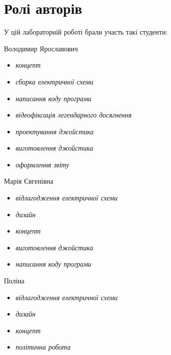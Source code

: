 \chapter*{Ролі авторів} 

У цій лабораторній роботі брали участь такі студенти:
\begin{itemize}
 Володимир Ярославович
\begin{itemize}
    \item\textit{концепт}
    \item\textit{сборка електричної схеми}
    \item\textit{написання коду програми}
    \item\textit{відеофіксація легендарного досягнення}
    \item\textit{проектування джойстика}
    \item\textit{виготовлення джойстика}
    \item\textit{оформлення звіту}
\end{itemize}
 Марія Євгенівна
\begin{itemize}
    \item\textit{відлагодження електричної схеми}
    \item\textit{дизайн}
    \item\textit{концепт}
    \item\textit{виготовлення джойстика}
    \item\textit{написання коду програми}
\end{itemize}
 Поліна
\begin{itemize}
    \item\textit{відлагодження електричної схеми}
    \item\textit{дизайн}
    \item\textit{концепт}
    \item\textit{політична робота}
\end{itemize}
\end{itemize}